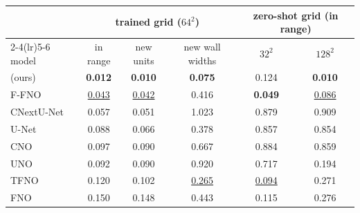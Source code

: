 \begin{tabular}{lccccc}
\toprule
 & \multicolumn{3}{c}{trained grid ($64^2$)} & \multicolumn{2}{c}{zero-shot grid (in range)} \\
\cmidrule(lr){2-4}\cmidrule(lr){5-6}
model & in range & new units & new wall widths & $32^2$ & $128^2$ \\
\midrule
\DU{} (ours) & \textbf{0.012} & \textbf{0.010} & \textbf{0.075} & 0.124 & \textbf{0.010} \\
\midrule
F-FNO & \underline{0.043} & \underline{0.042} & 0.416 & \textbf{0.049} & \underline{0.086} \\
CNextU-Net & 0.057 & 0.051 & 1.023 & 0.879 & 0.909 \\
U-Net & 0.088 & 0.066 & 0.378 & 0.857 & 0.854 \\
CNO & 0.097 & 0.090 & 0.667 & 0.884 & 0.859 \\
UNO & 0.092 & 0.090 & 0.920 & 0.717 & 0.194 \\
TFNO & 0.120 & 0.102 & \underline{0.265} & \underline{0.094} & 0.271 \\
FNO & 0.150 & 0.148 & 0.443 & 0.115 & 0.276 \\
\bottomrule
\end{tabular}
